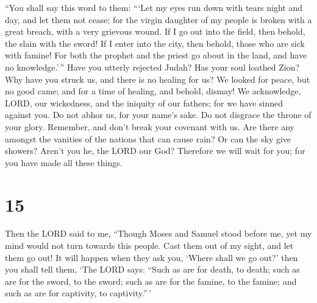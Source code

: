  ``You shall say this word to them: ```Let my eyes run
down with tears night and day, and let them not cease; for the virgin
daughter of my people is broken with a great breach, with a very
grievous wound.  If I go out into the field, then behold,
the slain with the sword! If I enter into the city, then behold, those
who are sick with famine! For both the prophet and the priest go about
in the land, and have no knowledge.'\,''  Have you
utterly rejected Judah? Has your soul loathed Zion? Why have you struck
us, and there is no healing for us? We looked for peace, but no good
came; and for a time of healing, and behold, dismay!  We
acknowledge, LORD, our wickedness, and the iniquity of our fathers; for
we have sinned against you.  Do not abhor us, for your
name's sake. Do not disgrace the throne of your glory. Remember, and
don't break your covenant with us.  Are there any amongst
the vanities of the nations that can cause rain? Or can the sky give
showers? Aren't you he, the LORD our God? Therefore we will wait for
you; for you have made all these things.

\hypertarget{section-14}{%
\section{15}\label{section-14}}

 Then the LORD said to me, ``Though Moses and Samuel stood
before me, yet my mind would not turn towards this people. Cast them out
of my sight, and let them go out!  It will happen when
they ask you, `Where shall we go out?' then you shall tell them, `The
LORD says: ``Such as are for death, to death; such as are for the sword,
to the sword; such as are for the famine, to the famine; and such as are
for captivity, to captivity.''\,'

